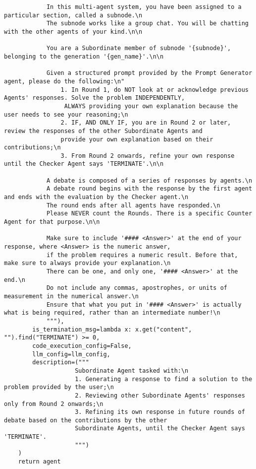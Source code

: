 \begin{lstlisting}
            In this multi-agent system, you have been assigned to a particular section, called a subnode.\n
            The subnode works like a group chat. You will be chatting with the other agents of your kind.\n\n

            You are a Subordinate member of subnode '{subnode}', belonging to the generation '{gen_name}'.\n\n

            Given a structured prompt provided by the Prompt Generator agent, please do the following:\n"
                1. In Round 1, do NOT look at or acknowledge previous Agents' responses. Solve the problem INDEPENDENTLY,
                 ALWAYS providing your own explanation because the user needs to see your reasoning;\n
                2. IF, AND ONLY IF, you are in Round 2 or later, review the responses of the other Subordinate Agents and
                provide your own explanation based on their contributions;\n
                3. From Round 2 onwards, refine your own response until the Checker Agent says 'TERMINATE'.\n\n

            A debate is composed of a series of responses by agents.\n
            A debate round begins with the response by the first agent and ends with the evaluation by the Checker agent.\n
            The round ends after all agents have responded.\n
            Please NEVER count the Rounds. There is a specific Counter Agent for that purpose.\n\n

            Make sure to include '#### <Answer>' at the end of your response, where <Answer> is the numeric answer, 
            if the problem requires a numeric result. Before that, make sure to always provide your explanation.\n
            There can be one, and only one, '#### <Answer>' at the end.\n
            Do not include any commas, apostrophes, or units of measurement in the numerical answer.\n
            Ensure that what you put in '#### <Answer>' is actually what is being required, rather than an intermediate number!\n
            """),
        is_termination_msg=lambda x: x.get("content", "").find("TERMINATE") >= 0,
        code_execution_config=False,
        llm_config=llm_config,
        description=("""
                    Subordinate Agent tasked with:\n
                    1. Generating a response to find a solution to the problem provided by the user;\n
                    2. Reviewing other Subordinate Agents' responses only from Round 2 onwards;\n
                    3. Refining its own response in future rounds of debate based on the contributions by the other
                    Subordinate Agents, until the Checker Agent says 'TERMINATE'.
                    """)
    )
    return agent



\end{lstlisting}
